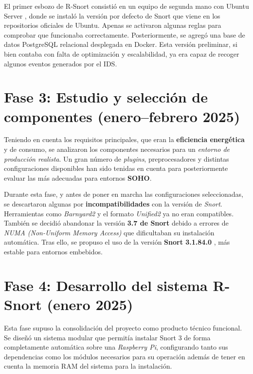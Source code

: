 \documentclass[11pt,a4paper,twoside]{report}
\begin{document}
El primer esbozo de R-Snort consistió en un equipo de segunda mano con Ubuntu Server \cite{insani2023implementation}, donde se instaló la versión por defecto de Snort que viene en los repositorios oficiales de Ubuntu. Apenas se activaron algunas reglas para comprobar que funcionaba correctamente. Posteriormente, se agregó una base de datos PostgreSQL relacional \cite{gkamas2022performance} desplegada en Docker. Esta versión preliminar, si bien contaba con falta de optimización y escalabilidad, ya era capaz de recoger algunos eventos generados por el IDS.

\section{Fase 3: Estudio y selección de componentes (enero–febrero 2025)}

Teniendo en cuenta los requisitos principales, que eran la \textbf{eficiencia energética} y de consumo, se analizaron los componentes necesarios para un \textit{entorno de producción realista}. Un gran número de \textit{plugins}, preprocesadores y distintas configuraciones disponibles han sido tenidas en cuenta para posteriormente evaluar las más adecuadas para entornos \textbf{SOHO}.\newline

Durante esta fase, y antes de poner en marcha las configuraciones seleccionadas, se descartaron algunas por \textbf{incompatibilidades} con la versión de \textit{Snort}. Herramientas como \textit{Barnyard2} \cite{o2015snort} y el formato \textit{Unified2} ya no eran compatibles. También se decidió abandonar la versión \textbf{3.7 de Snort} debido a errores de \textit{NUMA (Non-Uniform Memory Access)} que dificultaban su instalación automática. Tras ello, se propuso el uso de la versión \textbf{Snort 3.1.84.0} \cite{snort3_3184}, más estable para entornos embebidos.

\section{Fase 4: Desarrollo del sistema R-Snort (enero 2025)}

Esta fase supuso la consolidación del proyecto como producto técnico funcional. Se diseñó un sistema modular que permitía instalar Snort 3 de forma completamente automática sobre una \textit{Raspberry Pi}, configurando tanto sus dependencias como los módulos necesarios para su operación además de tener en cuenta la memoria RAM del sistema para la instalación.
\end{document}
